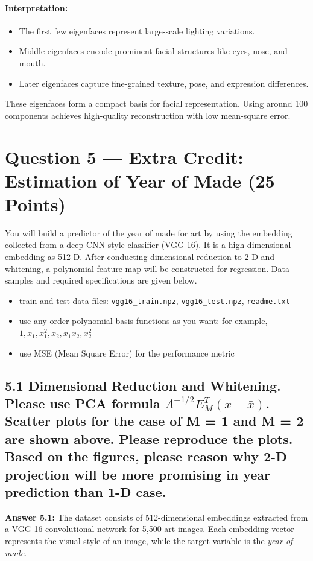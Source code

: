 \documentclass[12pt]{article}
\begin{document}
\paragraph{Interpretation:}
\begin{itemize}
    \item The first few eigenfaces represent large-scale lighting variations.
    \item Middle eigenfaces encode prominent facial structures like eyes, nose, and mouth.
    \item Later eigenfaces capture fine-grained texture, pose, and expression differences.
\end{itemize}

These eigenfaces form a compact basis for facial representation.  
Using around 100 components achieves high-quality reconstruction with low mean-square error.

\newpage
\section*{Question 5 — Extra Credit: Estimation of Year of Made (25 Points)}

You will build a predictor of the year of made for art by using the embedding collected from a deep-CNN style classifier (VGG-16). It is a high dimensional embedding as 512-D. After conducting dimensional reduction to 2-D and whitening, a polynomial feature map will be constructed for regression. Data samples and required specifications are given below.

\begin{itemize}
  \item train and test data files: \texttt{vgg16\_train.npz}, \texttt{vgg16\_test.npz}, \texttt{readme.txt}
  \item use any order polynomial basis functions as you want: for example, $1, x_1, x_1^2, x_2, x_1x_2, x_2^2$
  \item use MSE (Mean Square Error) for the performance metric
\end{itemize}

\subsection*{5.1
Dimensional Reduction and Whitening. Please use PCA formula $\Lambda^{-1/2}E_M^T(x-\bar{x})$. Scatter plots for the case of M = 1 and M = 2 are shown above. Please reproduce the plots. Based on the figures, please reason why 2-D projection will be more promising in year prediction than 1-D case.}
\textbf{Answer 5.1:}
The dataset consists of 512-dimensional embeddings extracted from a VGG-16 convolutional
network for 5,500 art images. Each embedding vector represents the visual style of an image,
while the target variable is the \emph{year of made}.
\end{document}
